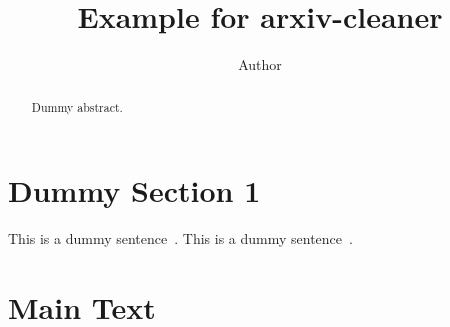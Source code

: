 \documentclass[twocolumn]{article}
\title{Example for arxiv-cleaner}
\author{Author}
\begin{document}
\maketitle



\begin{abstract}
Dummy abstract.
\end{abstract}
 


\section{Dummy Section 1}
\label{sec:dummy1}

This is a dummy sentence~\cite{Authors14}. This is a dummy sentence~\cite{Authors14b}.
 \section{Main Text}
\label{sec:main}
\end{document}
